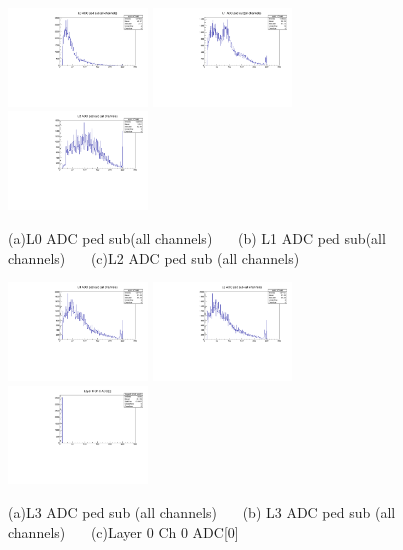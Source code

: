 \documentclass[a4paper,11pt]{article}
\theoremstyle{mytheor}
\begin{document}
\begin{figure}[H] 
\vspace*{-0.3cm} 
\includegraphics[width=0.33\textwidth,scale=0.5,trim=0 0 0 0,clip]{plotsdir/file0_muons-adcL0ChAll-1.pdf} 
\includegraphics[width=0.33\textwidth,scale=0.5,trim=0 0 0 0,clip]{plotsdir/file0_muons-adcL1ChAll-1.pdf} 
\includegraphics[width=0.33\textwidth,scale=0.5,trim=0 0 0 0,clip]{plotsdir/file0_muons-adcL2ChAll-1.pdf} 
\caption{(a)L0 ADC ped sub(all channels) ~~~(b) L1 ADC ped sub(all channels) ~~~(c)L2 ADC ped sub (all channels) } 
\end{figure} 
\begin{figure}[H] 
\vspace*{-0.3cm} 
\includegraphics[width=0.33\textwidth,scale=0.5,trim=0 0 0 0,clip]{plotsdir/file0_muons-adcL3ChAll-1.pdf} 
\includegraphics[width=0.33\textwidth,scale=0.5,trim=0 0 0 0,clip]{plotsdir/file0_muons-adcL3ChAll-1.pdf} 
\includegraphics[width=0.33\textwidth,scale=0.5,trim=0 0 0 0,clip]{plotsdir/file0_muons-Layer0_Ch0_adc0-1.pdf} 
\caption{(a)L3 ADC ped sub (all channels) ~~~(b) L3 ADC ped sub (all channels) ~~~(c)Layer 0 Ch 0 ADC[0] } 
\end{figure} 
\end{document}
